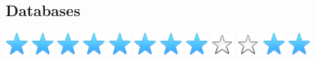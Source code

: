 \documentclass[]{cv-class}
\begin{document}
\begin{aside}
  \section{Databases}
    {\includegraphics[scale=0.30]{img/star.png}
    \includegraphics[scale=0.30]{img/star.png}
    \includegraphics[scale=0.30]{img/star.png}
    \includegraphics[scale=0.30]{img/star.png}
    \includegraphics[scale=0.30]{img/star.png}}
    {\includegraphics[scale=0.30]{img/star.png}
    \includegraphics[scale=0.30]{img/star.png}
    \includegraphics[scale=0.30]{img/star.png}
    \includegraphics[scale=0.30]{img/star_empty.png}
    \includegraphics[scale=0.30]{img/star_empty.png}}
    {\includegraphics[scale=0.30]{img/star.png}
    \includegraphics[scale=0.30]{img/star.png}
}
\end{aside}
\end{document}
